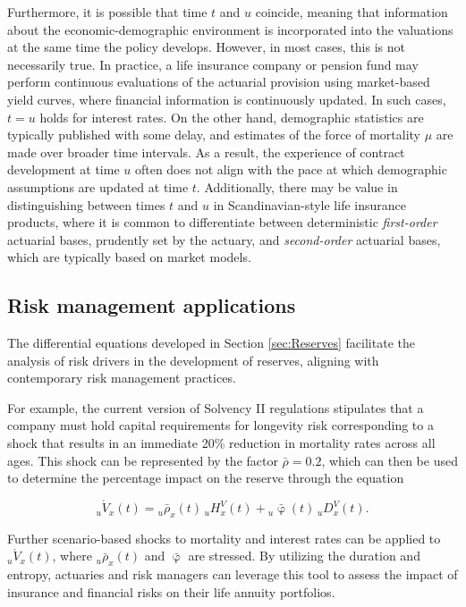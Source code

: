 \documentclass[12pt]{article}
\begin{document}
{Furthermore, it is possible that time \( t \) and \( u \) coincide, meaning that information about the economic-demographic environment is incorporated into the valuations at the same time the policy develops. However, in most cases, this is not necessarily true. In practice, a life insurance company or pension fund may perform continuous evaluations of the actuarial provision using market-based yield curves, where financial information is continuously updated. In such cases, \( t = u \) holds for interest rates. On the other hand, demographic statistics are typically published with some delay, and estimates of the force of mortality \( \mu \) are made over broader time intervals. As a result, the experience of contract development at time \( u \) often does not align with the pace at which demographic assumptions are updated at time \( t \). Additionally, there may be value in distinguishing between times \( t \) and \( u \) in Scandinavian-style life insurance products, where it is common to differentiate between deterministic \textit{first-order} actuarial bases, prudently set by the actuary, and \textit{second-order} actuarial bases, which are typically based on market models.


\subsection{Risk management applications}

The differential equations developed in Section \ref{sec:Reserves} facilitate the analysis of risk drivers in the development of reserves, aligning with contemporary risk management practices.

For example, the current version of Solvency II regulations stipulates that a company must hold capital requirements for longevity risk corresponding to a shock that results in an immediate 20\% reduction in mortality rates across all ages. This shock can be represented by the factor \( \bar{\rho} = 0.2 \), which can then be used to determine the percentage impact on the reserve through the equation 

\[
{}_u\acute{V}_x(t) = {}_u\bar{\rho}_x(t) \, {}_uH_x^V(t) + {}_u\bar{\upvarphi}(t) \, {}_uD_x^V(t).
\]

Further scenario-based shocks to mortality and interest rates can be applied to \( {}_u\acute{V}_x(t) \), where \( {}_u\bar{\rho}_x(t) \) and \( \bar{\upvarphi} \) are stressed. By utilizing the duration and entropy, actuaries and risk managers can leverage this tool to assess the impact of insurance and financial risks on their life annuity portfolios.

}
\end{document}

